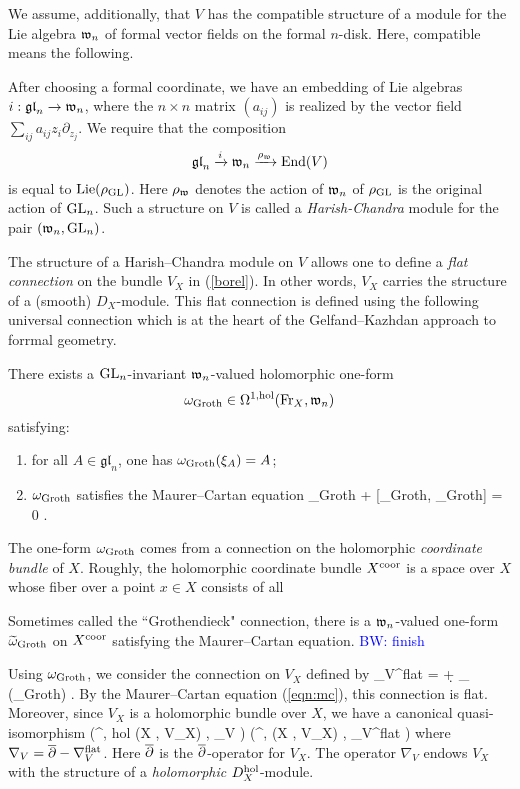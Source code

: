 \documentclass[11pt]{amsart}
\numberwithin{equation}{section}
\def\brian{\textcolor{blue}{BW: }\textcolor{blue}}
\def\fgl{\mathfrak{gl}}
\begin{document}
We assume, additionally, that $V$ has the compatible structure of a module for the Lie algebra $\fw_n$ of formal vector fields on the formal $n$-disk.
Here, compatible means the following.

After choosing a formal coordinate, we have an embedding of Lie algebras $i : \fgl_n \to \fw_n$, where the $n\times n$ matrix $(a_{ij})$ is realized by the vector field $\sum_{ij} a_{ij} z_i \partial_{z_j}$.
We require that the composition 
\[
\fgl_n \xto{i} \fw_n \xto{\rho_\fw} {\rm End}(V) 
\]
is equal to ${\rm Lie}(\rho_{\rm GL})$. 
Here $\rho_{\fw}$ denotes the action of $\fw_n$ of $\rho_{\rm GL}$ is the original action of $\GL_n$. 
Such a structure on $V$ is called a {\em Harish-Chandra} module for the pair $(\fw_n, \GL_n)$. 

The structure of a Harish--Chandra module on $V$ allows one to define a {\em flat connection} on the bundle $V_X$ in (\ref{borel}). 
In other words, $V_X$ carries the structure of a (smooth) $D_X$-module. 
This flat connection is defined using the following universal connection which is at the heart of the Gelfand--Kazhdan approach to forrmal geometry. 

There exists a $\GL_n$-invariant $\fw_n$-valued holomorphic one-form
\[
\omega_{\rm Groth} \in \Omega^{1, \rm hol}({\rm Fr}_X , \fw_n)
\]
satisfying:
\begin{enumerate}
\item \label{groth1} for all $A \in \fgl_n$, one has $\omega_{\rm Groth} (\xi_A) = A$;
\item \label{gorth2} $\omega_{\rm Groth}$ satisfies the Maurer--Cartan equation
\beqn\label{eqn:mc}
\partial \omega_{\rm Groth} +  [\omega_{\rm Groth}, \omega_{\rm Groth}] = 0 .
\eeqn
\end{enumerate}

\begin{rmk}
The one-form $\omega_{\rm Groth}$ comes from a connection on the holomorphic {\em coordinate bundle} of $X$. 
Roughly, the holomorphic coordinate bundle $X^{\rm coor}$ is a space over $X$ whose fiber over a point $x \in X$ consists of all 

Sometimes called the ``Grothendieck" connection, there is a $\fw_n$-valued one-form $\Tilde{\omega}_{\rm Groth}$ on $X^{\rm coor}$ satisfying the Maurer--Cartan equation.
\brian{finish}
\end{rmk}

Using $\omega_{\rm Groth}$, we consider the connection on $V_X$ defined by
\beqn
\nabla_V^{\rm flat} = \d + \rho_{\fw} (\omega_{\rm Groth}) .
\eeqn
By the Maurer--Cartan equation (\ref{eqn:mc}), this connection is flat. 
Moreover, since $V_X$ is a holomorphic bundle over $X$, we have a canonical quasi-isomorphism
\beqn
\left(\Omega^{\bu, \rm hol} (X , V_X) \; , \; \nabla_V \right) \xto{\simeq}\left(\Omega^{\bu, \bu} (X , V_X) \; , \; \nabla_V^{\rm flat} \right) 
\eeqn 
where $\nabla_V = \dbar -  \nabla_V^{\rm flat}$.
Here $\dbar$ is the $\dbar$-operator for $V_X$.
The operator $\nabla_V$ endows $V_X$ with the structure of a {\em holomorphic} $D^{\rm hol}_X$-module.
\end{document}
